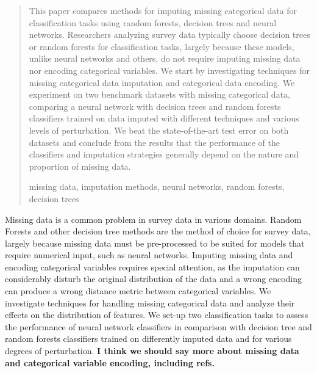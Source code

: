 \documentclass[10pt]{book}
\theoremstyle{definition}
\begin{document}
\begin{quotation}
This paper compares methods for imputing missing categorical data for classification
tasks using random forests, decision trees and neural networks.
Researchers analyzing survey data typically choose decision trees or random
forests for classification tasks, largely because these models, unlike neural
networks and others, do not require imputing missing data nor encoding categorical
variables. We start by investigating techniques for missing categorical data imputation
and categorical data encoding. We experiment on two benchmark datasets with missing categorical data,
comparing a neural network with decision trees and random forests classifiers
trained on data imputed with different techniques and various levels of perturbation. We beat the state-of-the-art test error on both datasets and conclude from the results that the performance of the classifiers and imputation strategies generally depend on the nature and proportion of missing data. \par

\vspace{9pt}
missing data, imputation methods, neural networks, random forests, decision
    trees
\par
\end{quotation}\par



\def\thefigure{\arabic{figure}}
\def\thetable{\arabic{table}}

\fontsize{12}{14pt plus.8pt minus .6pt}\selectfont

\newpage %

\setcounter{chapter}{1}
\setcounter{equation}{0} %

Missing data is a common problem in survey data in various domains. Random
Forests and other decision tree methods are the method of choice for survey
data, largely because missing data must be pre-processed to be suited for models
that require numerical input, such as neural networks. Imputing missing data and encoding categorical variables requires special attention, as the imputation can considerably disturb the original
distribution of the data and a wrong encoding can produce a wrong distance
metric between categorical variables. We investigate techniques for handling missing categorical data
and analyze their effects on the distribution of features. We set-up two
classification tasks to assess the performance of neural network classifiers in
comparison with decision tree and random forests classifiers trained on
differently imputed data and for various degrees of perturbation. \textbf{I
think we should say more about missing data and categorical variable encoding,
including refs.} 
\end{document}
